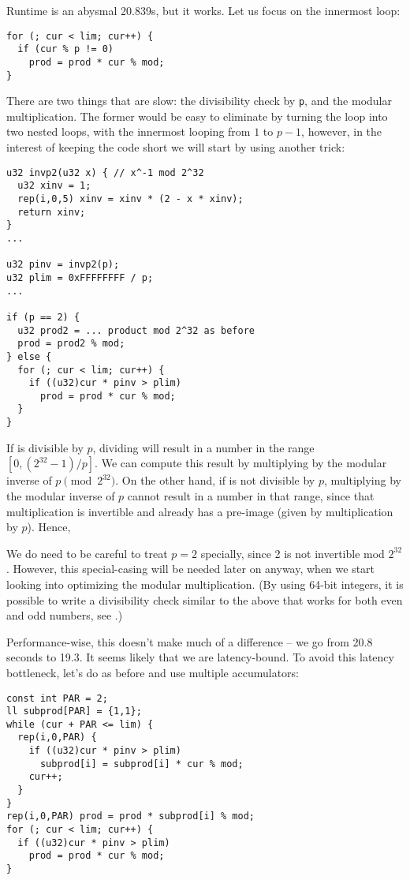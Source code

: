 Runtime is an abysmal 20.839s, but it works.
Let us focus on the innermost loop:
\begin{lstlisting}
for (; cur < lim; cur++) {
  if (cur % p != 0)
    prod = prod * cur % mod;
}
\end{lstlisting}

There are two things that are slow: the divisibility check by \texttt{p}, and the modular multiplication.
The former would be easy to eliminate by turning the loop into two nested loops, with the innermost looping from $1$ to $p-1$, however, in the interest of keeping the code short we will start by using another trick:

\begin{lstlisting}
u32 invp2(u32 x) { // x^-1 mod 2^32
  u32 xinv = 1;
  rep(i,0,5) xinv = xinv * (2 - x * xinv);
  return xinv;
}
...

u32 pinv = invp2(p);
u32 plim = 0xFFFFFFFF / p;
...

if (p == 2) {
  u32 prod2 = ... product mod 2^32 as before
  prod = prod2 % mod;
} else {
  for (; cur < lim; cur++) {
    if ((u32)cur * pinv > plim)
      prod = prod * cur % mod;
  }
}
\end{lstlisting}

If \verb@cur@ is divisible by $p$, dividing will result in a number in the range $[0, (2^{32}-1) / p]$.
We can compute this result by multiplying by the modular inverse of $p \pmod{2^{32}}$.
On the other hand, if \verb@cur@ is not divisible by $p$, multiplying by the modular inverse of $p$ cannot result in a number in that range, since that multiplication is invertible and already has a pre-image (given by multiplication by $p$).
Hence, \verb@cur % p == 0@ can be replaced by \verb@(u32)cur * pinv <= plim@, multiplication being a much cheaper operation than modulo.

We do need to be careful to treat $p = 2$ specially, since 2 is not invertible mod $2^{32}$.
However, this special-casing will be needed later on anyway, when we start looking into optimizing the modular multiplication.
(By using 64-bit integers, it is possible to write a divisibility check similar to the above that works for both even and odd numbers, see \cite{fastdivcheck}.)

Performance-wise, this doesn't make much of a difference -- we go from 20.8 seconds to 19.3.
It seems likely that we are latency-bound.
To avoid this latency bottleneck, let's do as before and use multiple accumulators:

\begin{lstlisting}
const int PAR = 2;
ll subprod[PAR] = {1,1};
while (cur + PAR <= lim) {
  rep(i,0,PAR) {
    if ((u32)cur * pinv > plim)
      subprod[i] = subprod[i] * cur % mod;
    cur++;
  }
}
rep(i,0,PAR) prod = prod * subprod[i] % mod;
for (; cur < lim; cur++) {
  if ((u32)cur * pinv > plim)
    prod = prod * cur % mod;
}
\end{lstlisting}

